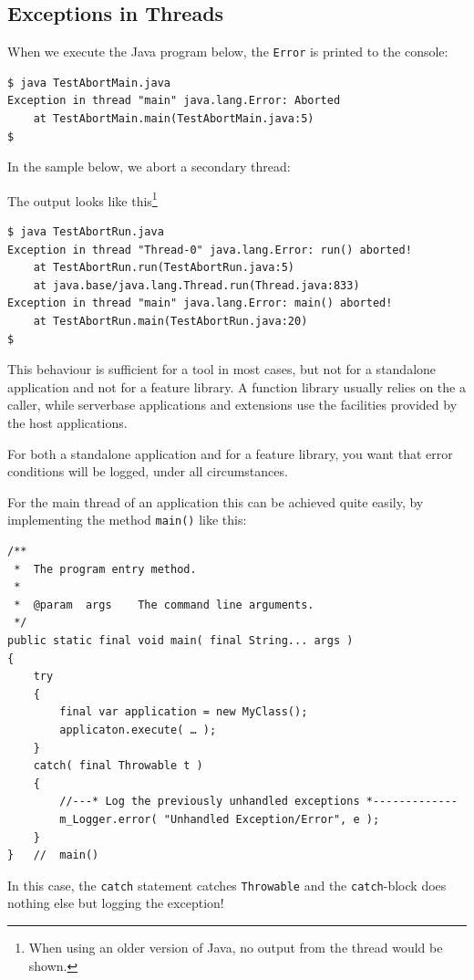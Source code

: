 \documentclass[11pt,a4paper, titlepage, parskip=half, headsepline, footsepline, cleardoublepage=current, headheight=1cm]{scrbook}
\begin{document}
\subsection{Exceptions in Threads}\label{sec:ExceptionHandlingInThreads}
When we execute the Java program below, the \lstinline|Error| is printed to the console:


\begin{verbatim}
$ java TestAbortMain.java
Exception in thread "main" java.lang.Error: Aborted
    at TestAbortMain.main(TestAbortMain.java:5)
$ 
\end{verbatim}

In the sample below, we abort a secondary thread:


The output looks like this\footnote{When using an older version of Java, no output from the thread would be shown.}
\begin{verbatim}
$ java TestAbortRun.java
Exception in thread "Thread-0" java.lang.Error: run() aborted!
    at TestAbortRun.run(TestAbortRun.java:5)
    at java.base/java.lang.Thread.run(Thread.java:833)
Exception in thread "main" java.lang.Error: main() aborted!
    at TestAbortRun.main(TestAbortRun.java:20)
$ 
\end{verbatim}

This behaviour is sufficient for a tool in most cases, but not for a standalone application and not for a feature library. A function library usually relies on the a caller, while serverbase applications and extensions use the facilities provided by the host applications.

For both a standalone application and for a feature library, you want that error conditions will be logged, under all circumstances.

For the main thread of an application this can be achieved quite easily, by implementing the method \lstinline|main()| like this:
\begin{lstlisting}
/**
 *  The program entry method.
 *
 *  @param  args    The command line arguments.
 */
public static final void main( final String... args )
{
    try
    {
        final var application = new MyClass();
        applicaton.execute( … );
    }
    catch( final Throwable t )
    {
        //---* Log the previously unhandled exceptions *-------------
        m_Logger.error( "Unhandled Exception/Error", e );
    }
}   //  main()
\end{lstlisting}
In this case, the \lstinline|catch| statement catches \lstinline|Throwable| and the 
\lstinline|catch|-block does nothing else but logging the exception!
\end{document}
